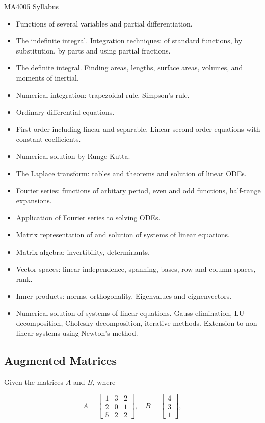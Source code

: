 \documentclass[12pt, a4paper]{article}
\begin{document}
\author{Kevin O'Brien}

MA4005 Syllabus
\begin{itemize}
\item Functions of several variables and partial differentiation.
\item The indefinite integral. Integration techniques: of standard functions, by substitution, by parts and using partial fractions.
\item The definite integral. Finding areas, lengths, surface areas, volumes, and moments of inertial.
\item Numerical integration: trapezoidal rule, Simpson's rule.
\item Ordinary differential equations.
\item First order including linear and separable. Linear second order equations with constant coefficients.
\item Numerical solution by Runge-Kutta. 
\item The Laplace transform: tables and theorems and solution of linear ODEs.
\item Fourier series: functions of arbitary period, even and odd functions, half-range expansions.
\item Application of Fourier series to solving ODEs.
\item Matrix representation of and solution of systems of linear equations.
\item Matrix algebra: invertibility, determinants.
\item Vector spaces: linear independence, spanning, bases, row and column spaces, rank.
\item Inner products: norms, orthogonality. Eigenvalues and eignenvectors.
\item Numerical solution of systems of linear equations. Gauss elimination, LU decomposition, Cholesky decomposition,
iterative methods. Extension to non-linear systems using Newton's method.
\end{itemize}
\newpage


\subsection*{Augmented Matrices}
Given the matrices $A$ and $B$, where

\[
A =
  \begin{bmatrix}
    1 & 3 & 2 \\
    2 & 0 & 1 \\
    5 & 2 & 2
  \end{bmatrix}
, \quad
B =
  \begin{bmatrix}
    4 \\
    3 \\
    1
  \end{bmatrix},
\]
\end{document}
